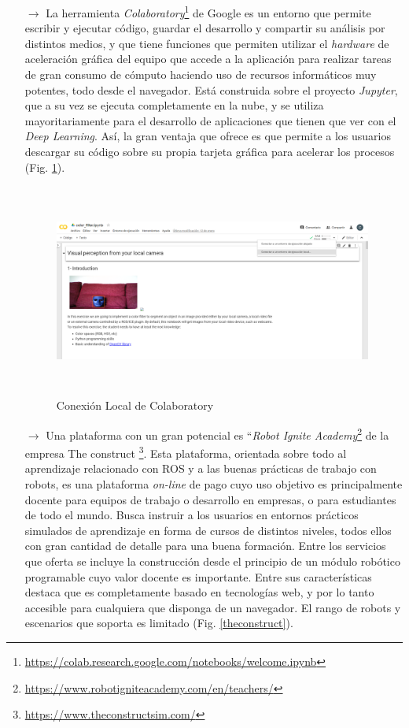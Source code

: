 \begin{itemize}
\item [$\rightarrow$] La herramienta \textit{Colaboratory}\footnote{\url{https://colab.research.google.com/notebooks/welcome.ipynb}} de Google es un entorno que permite escribir y ejecutar código, guardar el desarrollo y compartir su análisis por distintos medios, y que tiene funciones que permiten utilizar el \textit{hardware} de aceleración gráfica del equipo que accede a la aplicación para realizar tareas de gran consumo de cómputo haciendo uso de recursos informáticos muy potentes, todo desde el navegador. Está construida sobre el proyecto \textit{Jupyter}, que a su vez se ejecuta completamente en la nube, y se utiliza mayoritariamente para el desarrollo  de aplicaciones que tienen que ver con el \textit{Deep Learning}. Así, la gran ventaja que ofrece es que permite a los usuarios descargar su código sobre su propia tarjeta gráfica para acelerar los procesos (Fig. \ref{colab}).
\begin{figure}[!htbp]  \centering\noindent
    \includegraphics[width=0.99\textwidth,height=7cm]{figures/colab.png}
    \caption{Conexión Local de Colaboratory}
    \label{colab}
\end{figure}
\item [$\rightarrow$]Una plataforma con un gran potencial es ``\textit{Robot Ignite Academy}\footnote{\url{https://www.robotigniteacademy.com/en/teachers/}} de la empresa The construct \footnote{\url{https://www.theconstructsim.com/}}. Esta plataforma, orientada sobre todo al aprendizaje relacionado con ROS y a las buenas prácticas de trabajo con robots, es una plataforma \textit{on-line} de pago cuyo uso objetivo es principalmente docente para equipos de trabajo o desarrollo en empresas, o para estudiantes de todo el mundo. Busca instruir a los usuarios en entornos prácticos simulados de aprendizaje en forma de cursos de distintos niveles, todos ellos con gran cantidad de detalle para una buena formación. Entre los servicios que oferta se incluye la construcción desde el principio de un módulo robótico programable cuyo valor docente es importante. Entre sus características destaca que es completamente basado en tecnologías web, y por lo tanto accesible para cualquiera que disponga de un navegador. El rango de robots y escenarios que soporta es limitado (Fig. \ref{theconstruct}).

\end{itemize}
